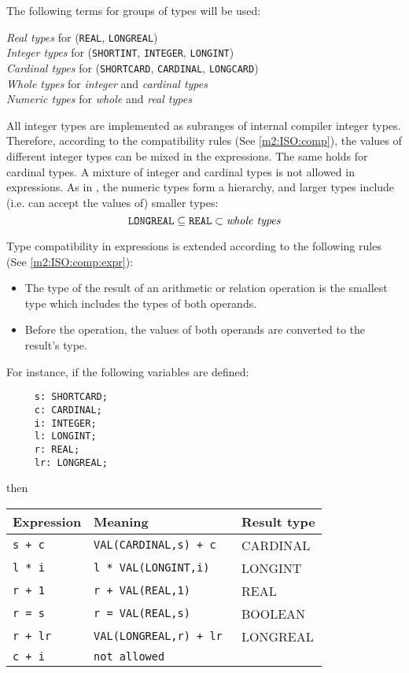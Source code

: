 The following terms for groups of types will be used:
\begin{flushleft}
{\em Real  types\/} for (\verb'REAL', \verb'LONGREAL')                       \\
{\em Integer  types\/} for (\verb'SHORTINT', \verb'INTEGER', \verb'LONGINT')        \\
{\em Cardinal types\/} for (\verb'SHORTCARD', \verb'CARDINAL', \verb'LONGCARD')     \\
{\em Whole    types\/} for {\em integer\/} and {\em cardinal types} \\
{\em Numeric  types\/} for {\em whole\/} and {\em real types}          \\
\end{flushleft}

All integer types are implemented as subranges of
internal compiler integer types. Therefore, according to the
compatibility rules (See \ref{m2:ISO:comp}), the values of different
integer types can be mixed in the expressions. The same holds for
cardinal  types. A mixture of integer and cardinal types
is not allowed in expressions. As in \ot{}, the numeric types form a
hierarchy, and larger types include (i.e. can accept the values
of) smaller types:
$$
\mbox{{\tt LONGREAL}} \subseteq \mbox{{\tt REAL}} \subset \mbox{\em whole types}
$$

Type compatibility in expressions is extended according to the
following rules (See \ref{m2:ISO:comp:expr}):
\begin{itemize}
\item   The  type of the result of an arithmetic or relation
        operation is the smallest type which includes the types
        of both operands.

\item   Before the operation, the values of  both  operands  are
        converted to the result's type.
\end{itemize}

For instance, if the following variables are defined:
\begin{verbatim}
     s: SHORTCARD;
     c: CARDINAL;
     i: INTEGER;
     l: LONGINT;
     r: REAL;
     lr: LONGREAL;
\end{verbatim}
then
\begin{center}
\begin{tabular}{lll}
\bf Expression &\bf Meaning &\bf Result type \\ \hline
\tt s + c        &\tt VAL(CARDINAL,s) + c       & CARDINAL \\
\tt l * i        &\tt l * VAL(LONGINT,i)        & LONGINT \\
\tt r + 1        &\tt r + VAL(REAL,1)           & REAL    \\
\tt r = s        &\tt r = VAL(REAL,s)           & BOOLEAN \\
\tt r + lr       &\tt VAL(LONGREAL,r) + lr      & LONGREAL \\
\tt c + i        &\tt not allowed               &           \\
\end{tabular}
\end{center}

